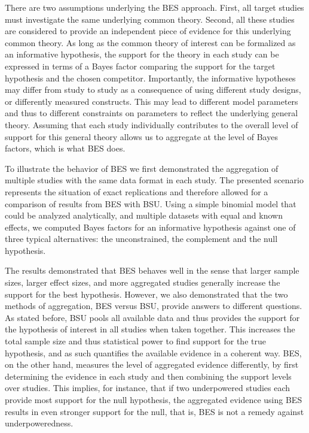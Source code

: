 \documentclass[11pt,reqno]{article}
\begin{document}
There are two assumptions underlying the BES approach. First, all target studies must investigate the same underlying common theory. Second, all these studies are considered to provide an independent piece of evidence for this underlying common theory.
As long as the common theory of interest can be formalized as an informative hypothesis, the support for the theory in each study can be expressed in terms of a Bayes factor comparing the support for the target hypothesis and the chosen competitor. Importantly, the informative hypotheses may differ from study to study as a consequence of using different study designs, or differently measured constructs. This may lead to different model parameters and thus to different constraints on parameters to reflect the underlying general theory. Assuming that each study individually contributes to the overall level of support for this general theory allows us to aggregate at the level of Bayes factors, which is what BES does.



To illustrate the behavior of BES we first demonstrated the aggregation of multiple studies with the same data format in each study. The presented scenario represents the situation of exact replications and therefore allowed for a comparison of results from BES with BSU. Using a simple binomial model that could be analyzed analytically, and multiple datasets with equal and known effects, we computed Bayes factors for an informative hypothesis against one of three typical alternatives: the unconstrained, the complement and the null hypothesis.

The results demonstrated that BES behaves well in the sense that larger sample sizes, larger effect sizes, and more aggregated studies generally increase the support for the best hypothesis. However, we also demonstrated that the two methods of aggregation, BES versus BSU, provide answers to different questions. As stated before, BSU pools all available data and thus provides the support for the hypothesis of interest in all studies when taken together. This increases the total sample size and thus statistical power to find support for the true hypothesis, and as such quantifies the available evidence in a coherent way. BES, on the other hand, measures the level of aggregated evidence differently, by first determining the evidence in each study and then combining the support levels over studies. This implies, for instance, that if two underpowered studies each provide most support for the null hypothesis, the aggregated evidence using BES results in even stronger support for the null, that is, BES is not a remedy against underpoweredness.
\end{document}
